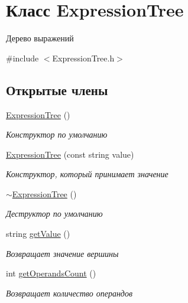 \hypertarget{class_expression_tree}{}\section{Класс Expression\+Tree}
\label{class_expression_tree}


Дерево выражений  




{\ttfamily \#include $<$Expression\+Tree.\+h$>$}

\subsection*{Открытые члены}
\begin{DoxyCompactItemize}
\item 
\mbox{\hyperlink{class_expression_tree_a0d743ee804cf5d9c792906f936151886}{Expression\+Tree}} ()
\begin{DoxyCompactList}\small\item\em Конструктор по умолчанию \end{DoxyCompactList}\item 
\mbox{\hyperlink{class_expression_tree_aa158e3eced2b61eedabec90ff8f62a3b}{Expression\+Tree}} (const string value)
\begin{DoxyCompactList}\small\item\em Конструктор, который принимает значение \end{DoxyCompactList}\item 
\mbox{\hyperlink{class_expression_tree_a7c172d77927af5a57fded65b1777fc17}{$\sim$\+Expression\+Tree}} ()
\begin{DoxyCompactList}\small\item\em Деструктор по умолчанию \end{DoxyCompactList}\item 
string \mbox{\hyperlink{class_expression_tree_ab8b29bfa5c593849c39becf1b501c80f}{get\+Value}} ()
\begin{DoxyCompactList}\small\item\em Возвращает значение вершины \end{DoxyCompactList}\item 
int \mbox{\hyperlink{class_expression_tree_a8b072f45d0e8dbcd9aa7159c10792407}{get\+Operands\+Count}} ()
\begin{DoxyCompactList}\small\item\em Возвращает количество операндов \end{DoxyCompactList}\item 

\end{DoxyCompactItemize}
